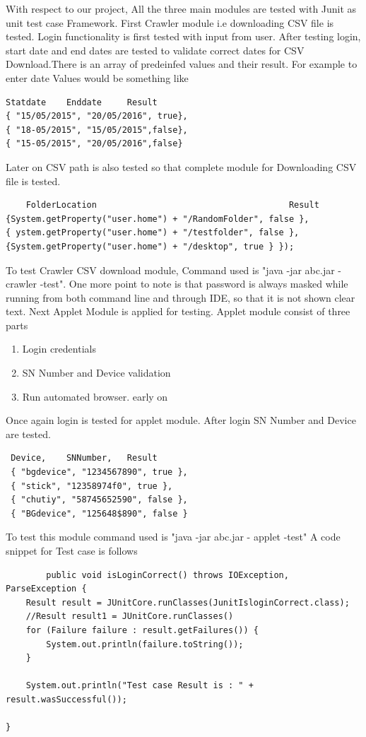 \documentclass[article,type=msc,colorback,accentcolor=tud9c,twoside,11pt]{tudthesis}
\begin{document}
With respect to our project, All the three main modules are tested with Junit as unit test case Framework. First Crawler module i.e downloading CSV file is tested. Login functionality is first tested with input from user. After testing login, start date and end dates are tested to validate correct dates for CSV Download.There is an array of predeinfed values and their result.
For example to enter date Values would be something like
\begin{lstlisting}
Statdate 	Enddate 	Result
{ "15/05/2015", "20/05/2016", true},
{ "18-05/2015", "15/05/2015",false},
{ "15-05/2015", "20/05/2016",false}
\end{lstlisting}
 Later on CSV path is also tested so that complete module for Downloading CSV file is tested.
 \begin{lstlisting}
	FolderLocation										Result
{System.getProperty("user.home") + "/RandomFolder", false },
{ ystem.getProperty("user.home") + "/testfolder", false },
{System.getProperty("user.home") + "/desktop", true } });
\end{lstlisting}
 To test Crawler CSV download module, Command used is "java -jar abc.jar -crawler -test". One more point to note is that password is always masked while running from both command line and through IDE, so that it is not shown clear text. Next Applet Module is applied for testing. Applet module consist of three parts
 \begin{enumerate}
\item Login credentials
\item SN Number and Device validation
\item Run automated browser. early on 
\end{enumerate}
  Once again login is tested for applet module. After login SN Number and Device are tested.

\begin{lstlisting}
 Device, 	SNNumber, 	Result
 { "bgdevice", "1234567890", true },
 { "stick", "12358974f0", true },
 { "chutiy", "58745652590", false },
 { "BGdevice", "125648$890", false }
\end{lstlisting}   
  
    To test this module command used is "java -jar abc.jar - applet -test" A code snippet for Test case is follows
\begin{lstlisting}
		public void isLoginCorrect() throws IOException, ParseException {
	Result result = JUnitCore.runClasses(JunitIsloginCorrect.class);
	//Result result1 = JUnitCore.runClasses()
	for (Failure failure : result.getFailures()) {
		System.out.println(failure.toString());
	}

	System.out.println("Test case Result is : " + result.wasSuccessful());
	
}
\end{lstlisting}

\cleardoublepage
\cleardoublepage


\end{document}
